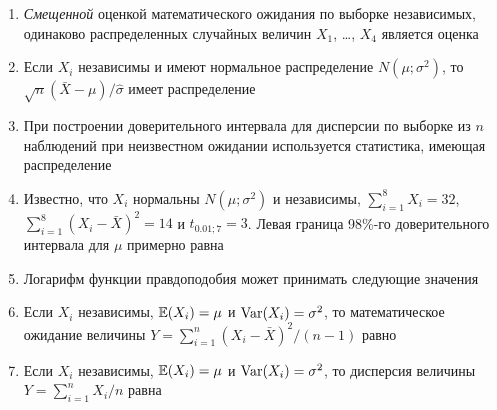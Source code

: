 \documentclass[12pt, a4paper]{article}\usepackage[]{graphicx}\usepackage[]{color}
\begin{document}
\begin{enumerate}

					\item \emph{Смещенной} оценкой математического ожидания по выборке независимых, одинаково распределенных случайных величин $X_1$, \ldots, $X_4$ является оценка


					\item Если $X_i$ независимы и имеют нормальное распределение $N(\mu;\sigma^2)$, то $\sqrt{n}(\bar{X}-\mu)/\hat{\sigma}$ имеет распределение


					\item При построении доверительного интервала для дисперсии по выборке из $n$ наблюдений при неизвестном ожидании используется статистика, имеющая распределение


					\item Известно, что $X_i$ нормальны $N(\mu;\sigma^2)$ и независимы, $\sum_{i=1}^8 X_i=32$, $\sum_{i=1}^8 (X_i-\bar{X})^2=14$ и $t_{0.01;7}=3$. Левая граница 98\%-го доверительного интервала для $\mu$ примерно равна



					\item Логарифм функции правдоподобия может принимать следующие значения

					\otvet{$[0;1]$}{$(-\infty;0]$}{$(-\infty;+\infty)$}{$[0;+\infty)$}{$[-1;1]$}

					\item Если $X_i$ независимы, $\mathbb{E}(X_i)=\mu$ и $\operatorname{Var}(X_i)=\sigma^2$, то математическое ожидание величины $Y=\sum_{i=1}^{n}(X_i-\bar{X})^2/(n-1)$ равно


					\item Если $X_i$ независимы, $\mathbb{E}(X_i)=\mu$ и $\operatorname{Var}(X_i)=\sigma^2$, то дисперсия величины $Y=\sum_{i=1}^{n}X_i/n$ равна



				\end{enumerate}
\end{document}
